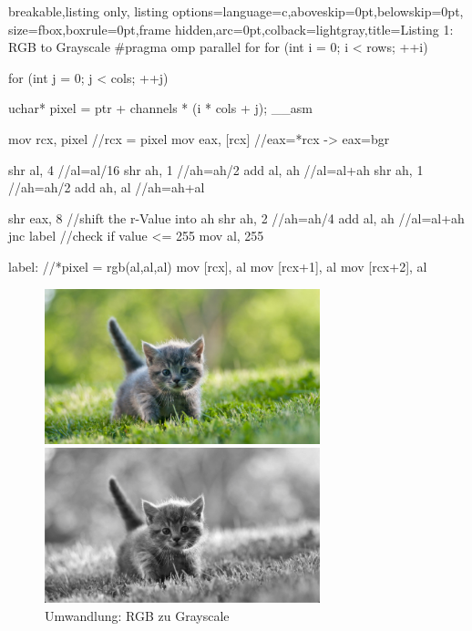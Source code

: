 \documentclass[11pt]{amsart}
\begin{document}
  \begin{tcblisting}{breakable,listing only,
  listing options={language=c,aboveskip=0pt,belowskip=0pt},
  size=fbox,boxrule=0pt,frame hidden,arc=0pt,colback=lightgray,title=Listing 1: RGB to Grayscale}
#pragma omp parallel for
     for (int i = 0; i < rows; ++i) {
         for (int j = 0; j < cols; ++j) {
             uchar* pixel = ptr + channels * (i * cols + j);
             __asm {
                     mov rcx, pixel    //rcx = pixel
                     mov eax, [rcx]    //eax=*rcx   -> eax=bgr

                     shr al, 4    //al=al/16
                     shr ah, 1    //ah=ah/2
                     add al, ah   //al=al+ah	    
                     shr ah, 1    //ah=ah/2
                     add ah, al  //ah=ah+al

                     shr eax, 8    //shift the r-Value into ah
                     shr ah, 2    //ah=ah/4
                     add al, ah  //al=al+ah    	
                     jnc label    //check if value <= 255 
                     mov al, 255

             label:
             	    //*pixel = rgb(al,al,al)
                     mov [rcx], al  
                     mov [rcx+1], al
                     mov [rcx+2], al
             }
         }
     }
\end{tcblisting}
\newpage
\begin{figure}[thb!]
\begin{minipage}{8cm}
\includegraphics[width=8cm]{images/original.jpg}
\end{minipage}
\qquad
\begin{minipage}{8cm}
\includegraphics[width=8cm]{images/myRGB.png}
\end{minipage}
\caption{Umwandlung: RGB zu Grayscale}
\label{fig:grayscaleExample}
\end{figure}
\end{document}
